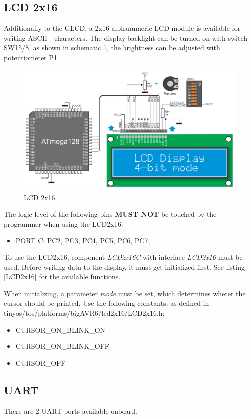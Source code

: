 \newpage

\subsection{LCD 2x16}

Additionally to the GLCD, a 2x16 alphanumeric LCD module is available for writing ASCII - characters. The display backlight can be turned on with switch SW15/8, as shown in schematic \ref{fig:lcd2x16}, the brightness can be adjusted with potentiometer P1

\begin{figure}[h]
 \centerline{\includegraphics[width=.8\columnwidth]{pics/lcd2x16.png}}
  \caption{LCD 2x16}
  \label{fig:lcd2x16}
\end{figure}

The logic level of the following pins \textbf{MUST NOT} be touched by the programmer when using the LCD2x16:

\begin{itemize}
 \item PORT C: PC2, PC3, PC4, PC5, PC6, PC7, 
\end{itemize}

To use the LCD2x16, component \textit{LCD2x16C} with interface \textit{LCD2x16} must be used. Before writing data to the display, it must get initialized first. See listing \ref{LCD2x16} for the available functions. 

When initializing, a parameter \textit{mode} must be set, which determines wheter the cursor should be printed. Use the following constants, as defined in tinyos/tos/platforms/bigAVR6/lcd2x16/LCD2x16.h:

\begin{itemize}
 \item CURSOR\_ON\_BLINK\_ON
 \item CURSOR\_ON\_BLINK\_OFF
 \item CURSOR\_OFF
\end{itemize}



\subsection{UART}

There are 2 UART ports available onboard.

